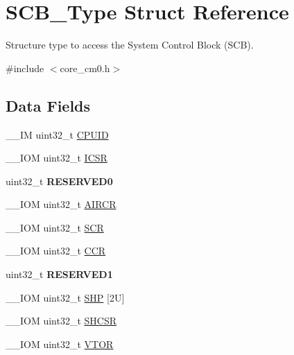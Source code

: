 \hypertarget{struct_s_c_b___type}{}\section{S\+C\+B\+\_\+\+Type Struct Reference}
\label{struct_s_c_b___type}


Structure type to access the System Control Block (S\+CB).  




{\ttfamily \#include $<$core\+\_\+cm0.\+h$>$}

\subsection*{Data Fields}
\begin{DoxyCompactItemize}
\item 
\+\_\+\+\_\+\+IM uint32\+\_\+t \mbox{\hyperlink{struct_s_c_b___type_adbf8292503748ba6421a523bdee6819d}{C\+P\+U\+ID}}
\item 
\+\_\+\+\_\+\+I\+OM uint32\+\_\+t \mbox{\hyperlink{struct_s_c_b___type_aced895d6aba03d72b0d865fcc5ce44ee}{I\+C\+SR}}
\item 
\mbox{\label{struct_s_c_b___type_af86c61a5d38a4fc9cef942a12744486b}} 
uint32\+\_\+t {\bfseries R\+E\+S\+E\+R\+V\+E\+D0}
\item 
\+\_\+\+\_\+\+I\+OM uint32\+\_\+t \mbox{\hyperlink{struct_s_c_b___type_a9b6ccd9c0c0865f8facad77ea37240b0}{A\+I\+R\+CR}}
\item 
\+\_\+\+\_\+\+I\+OM uint32\+\_\+t \mbox{\hyperlink{struct_s_c_b___type_acac65f229cb3fcb5369a0a9e0393b8c0}{S\+CR}}
\item 
\+\_\+\+\_\+\+I\+OM uint32\+\_\+t \mbox{\hyperlink{struct_s_c_b___type_ad68b5c1f2d9845ef4247cf2d9b041336}{C\+CR}}
\item 
\mbox{\label{struct_s_c_b___type_ac4ac04e673b5b8320d53f7b0947db902}} 
uint32\+\_\+t {\bfseries R\+E\+S\+E\+R\+V\+E\+D1}
\item 
\+\_\+\+\_\+\+I\+OM uint32\+\_\+t \mbox{\hyperlink{struct_s_c_b___type_aa043193516e3fc0abbf58ce7cf8cfb4e}{S\+HP}} \mbox{[}2\+U\mbox{]}
\item 
\+\_\+\+\_\+\+I\+OM uint32\+\_\+t \mbox{\hyperlink{struct_s_c_b___type_a44ad5c292dbd77e72f310902375a8a06}{S\+H\+C\+SR}}
\item 
\+\_\+\+\_\+\+I\+OM uint32\+\_\+t \mbox{\hyperlink{struct_s_c_b___type_ae457d2615e203c3d5904a43a1bc9df71}{V\+T\+OR}}

\end{DoxyCompactItemize}
